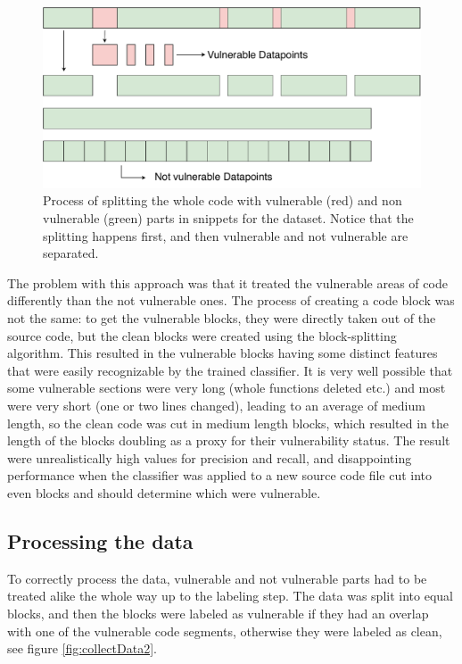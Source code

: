 \documentclass[
a4paper,
pagesize,
pdftex,
12pt,
twoside, %
BCOR=5mm, %
ngerman,
fleqn,
final,
]{scrartcl}
\begin{document}
	\begin{figure}[ht]
		\centering
		\includegraphics[width=0.8\linewidth]{img/collectData1}
		\caption{Process of splitting the whole code with vulnerable (red) and non vulnerable (green) parts in snippets for the dataset. Notice that the splitting happens first, and then vulnerable and not vulnerable are separated.}
		\label{fig:collectData1}
	\end{figure}
	
	The problem with this approach was that it treated the vulnerable areas of code differently than the not vulnerable ones. The process of creating a code block was not the same: to get the vulnerable blocks, they were directly taken out of the source code, but the clean blocks were created using the block-splitting algorithm. This resulted in the vulnerable blocks having some distinct features that were easily recognizable by the trained classifier. It is very well possible that some vulnerable sections were very long (whole functions deleted etc.) and most were very short (one or two lines changed), leading to an average of medium length, so the clean code was cut in medium length blocks, which resulted in the length of the blocks doubling as a proxy for their vulnerability status. The result were unrealistically high values for precision and recall, and disappointing performance when the classifier was applied to a new source code file cut into even blocks and should determine which were vulnerable.\\
	
	\subsection{Processing the data}\label{Processing}
	To correctly process the data, vulnerable and not vulnerable parts had to be treated alike the whole way up to the labeling step. The data was split into equal blocks, and then the blocks were labeled as vulnerable if they had an overlap with one of the vulnerable code segments, otherwise they were labeled as clean, see figure \ref{fig:collectData2}.
	
\end{document}
